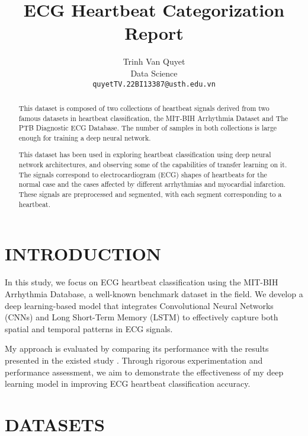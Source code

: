 \documentclass[10pt, conference]{IEEEtran}
\title{ECG Heartbeat Categorization Report}
\author{Trinh Van Quyet\\ Data Science\\ \texttt{quyetTV.22BI13387@usth.edu.vn}}
\date{}
\begin{document}
	\maketitle
	
	\begin{abstract}
		This dataset is composed of two collections of heartbeat signals derived from two famous datasets in heartbeat classification, the MIT-BIH Arrhythmia Dataset and The PTB Diagnostic ECG Database. The number of samples in both collections is large enough for training a deep neural network.
		
		This dataset has been used in exploring heartbeat classification using deep neural network architectures, and observing some of the capabilities of transfer learning on it. The signals correspond to electrocardiogram (ECG) shapes of heartbeats for the normal case and the cases affected by different arrhythmias and myocardial infarction. These signals are preprocessed and segmented, with each segment corresponding to a heartbeat.
	\end{abstract}
	
	
	\section{\textbf{I}NTRODUCTION}
	In this study, we focus on ECG heartbeat classification using the MIT-BIH Arrhythmia Database, a well-known benchmark dataset in the field. We develop a deep learning-based model that integrates Convolutional Neural Networks (CNNs) and Long Short-Term Memory (LSTM) to effectively capture both spatial and temporal patterns in ECG signals. 
	
	My approach is evaluated by comparing its performance with the results presented in the existed study \cite{kachuee2018}. Through rigorous experimentation and performance assessment, we aim to demonstrate the effectiveness of my deep learning model in improving ECG heartbeat classification accuracy. 
	
	\section{\textbf{D}ATASETS}
	
\end{document}
